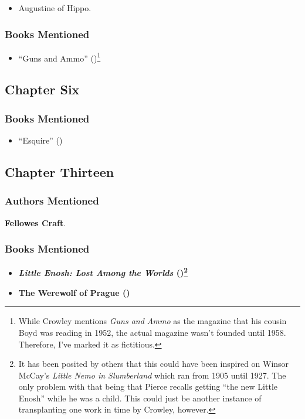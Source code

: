 \documentclass[
]{article}
\providecommand{\tightlist}{%
  \setlength{\itemsep}{0pt}\setlength{\parskip}{0pt}}
\begin{document}
\begin{itemize}
\tightlist
\item
  Augustine of Hippo.
\end{itemize}

\subsubsection{Books Mentioned}\label{books-mentioned-3}

\begin{itemize}
\tightlist
\item
  {``Guns and Ammo''} ()\footnote{While
    Crowley mentions \emph{Guns and Ammo} as the magazine that his
    cousin Boyd was reading in 1952, the actual magazine wasn't founded
    until 1958. Therefore, I've marked it as fictitious.}
\end{itemize}

\subsection{Chapter Six}\label{chapter-six}

\subsubsection{Books Mentioned}\label{books-mentioned-4}

\begin{itemize}
\tightlist
\item
  {``Esquire''} ()
\end{itemize}

\subsection{Chapter Thirteen}\label{chapter-thirteen}

\subsubsection{Authors Mentioned}\label{authors-mentioned-4}

\textbf{Fellowes Craft}.

\subsubsection{Books Mentioned}\label{books-mentioned-5}

\begin{itemize}
\tightlist
\item
  \textbf{\emph{Little Enosh: Lost Among the Worlds}
  ()\footnote{It has been posited by others
    that this could have been inspired on Winsor McCay's \emph{Little
    Nemo in Slumberland} which ran from 1905 until 1927. The only
    problem with that being that Pierce recalls getting ``the new Little
    Enosh'' while he was a child. This could just be another instance of
    transplanting one work in time by Crowley, however.}}
\item
  \textbf{The Werewolf of Prague ()}
\end{itemize}
\end{document}
